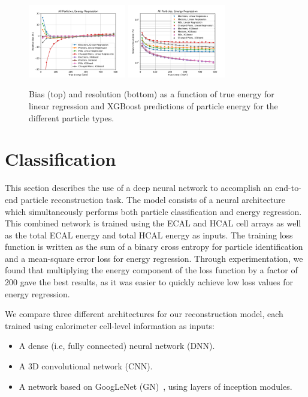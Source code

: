 \begin{figure}[htbp]
\centering
\includegraphics[width=0.38\textwidth]{Images/Calo/bias_vs_E_allparts_linreg_xgb.pdf}
\includegraphics[width=0.38\textwidth]{Images/Calo/res_vs_E_allparts_linreg_xgb_fits.pdf}
\caption{Bias (top) and resolution (bottom) as a function of true energy for linear regression and XGBoost  predictions of particle energy for the different particle types.\label{fig:reg_xgb_linreg}}
\end{figure}

\section{Classification}

This section describes the use of a deep neural network to accomplish an end-to-end particle reconstruction task. The model consists of a neural architecture which simultaneously performs both particle classification and energy regression. This combined network is trained using the ECAL and HCAL cell arrays as well as the total ECAL energy and total HCAL energy as inputs. The training loss function is written as the sum of a binary cross entropy for particle identification and a mean-square error loss for energy regression. Through experimentation, we found that multiplying the energy component of the loss function by a factor of 200 gave the best results, as it was easier to quickly achieve low loss values for energy regression.

We compare three different architectures for our reconstruction model, each trained using calorimeter cell-level information as inputs:
\begin{itemize}
\item A dense (i.e, fully connected) neural network (DNN).
\item A 3D convolutional network (CNN).
\item A network based on GoogLeNet (GN)~\cite{GoogLeNet}, using layers of inception modules.
\end{itemize}

